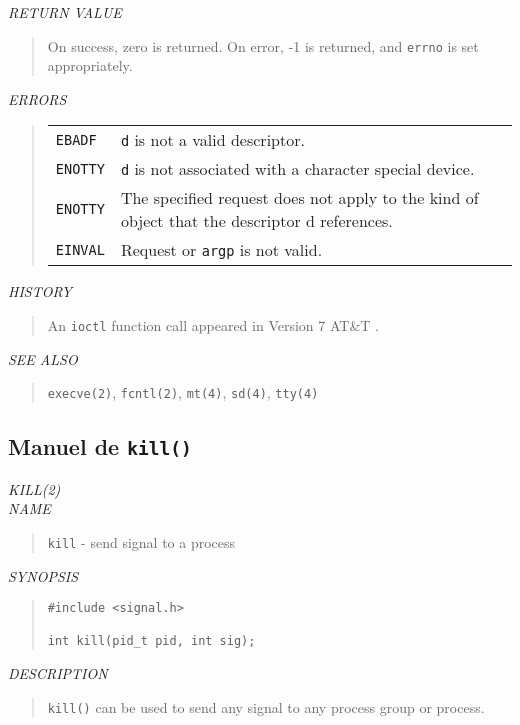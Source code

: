 \begin{appendix}
\begin{english}
{\sl RETURN VALUE}
\begin{quote}
	On success, zero is returned. On error, -1 is returned,
	and {\tt errno} is set appropriately.
\end{quote}

{\sl ERRORS}
\begin{quote}
\begin{tabular}{lp{8cm}}
	{\tt EBADF}		& {\tt d} is not a valid descriptor.\\
	{\tt ENOTTY}	& {\tt d} is not associated with a character special
					  device.\\
	{\tt ENOTTY}	& The specified request does not apply to the kind of
					  object that the descriptor d references.\\
	{\tt EINVAL}	& Request or {\tt argp} is not valid.
\end{tabular}
\end{quote}

{\sl HISTORY}
\begin{quote}
	An {\tt ioctl} function call appeared in Version 7 AT\&T {\Unix}.
\end{quote}

{\sl SEE ALSO}
\begin{quote}
	{\tt execve(2)}, {\tt fcntl(2)}, {\tt mt(4)}, {\tt sd(4)}, {\tt tty(4)}
\end{quote}
\end{english}

\subsection{Manuel de {\tt kill()}}
\begin{english}
{\sl KILL(2)}\\

{\sl NAME}
\begin{quote}
	{\tt kill} - send signal to a process
\end{quote}

{\sl SYNOPSIS}
\begin{quote}
\begin{verbatim}
#include <signal.h>

int kill(pid_t pid, int sig);
\end{verbatim}
\end{quote}

{\sl DESCRIPTION}
\begin{quote}
	{\tt kill()} can be used to send any signal to any process group or
	process.


\end{quote}
\end{english}
\end{appendix}
